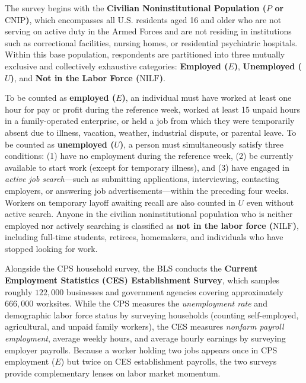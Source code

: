 \documentclass[11pt, a4paper]{article}
\begin{document}
The survey begins with the \textbf{Civilian Noninstitutional Population ($P$ or $\text{CNIP}$)}, which encompasses all U.S. residents aged 16 and older who are not serving on active duty in the Armed Forces and are not residing in institutions such as correctional facilities, nursing homes, or residential psychiatric hospitals. Within this base population, respondents are partitioned into three mutually exclusive and collectively exhaustive categories: \textbf{Employed ($E$)}, \textbf{Unemployed ($U$)}, and \textbf{Not in the Labor Force ($\text{NILF}$)}.

To be counted as \textbf{employed ($E$)}, an individual must have worked at least one hour for pay or profit during the reference week, worked at least 15 unpaid hours in a family-operated enterprise, or held a job from which they were temporarily absent due to illness, vacation, weather, industrial dispute, or parental leave. To be counted as \textbf{unemployed ($U$)}, a person must simultaneously satisfy three conditions: (1) have no employment during the reference week, (2) be currently available to start work (except for temporary illness), and (3) have engaged in \textit{active job search}—such as submitting applications, interviewing, contacting employers, or answering job advertisements—within the preceding four weeks. Workers on temporary layoff awaiting recall are also counted in $U$ even without active search. Anyone in the civilian noninstitutional population who is neither employed nor actively searching is classified as \textbf{not in the labor force ($\text{NILF}$)}, including full-time students, retirees, homemakers, and individuals who have stopped looking for work.

Alongside the CPS household survey, the BLS conducts the \textbf{Current Employment Statistics (CES) Establishment Survey}, which samples roughly $122{,}000$ businesses and government agencies covering approximately $666{,}000$ worksites. While the CPS measures the \textit{unemployment rate} and demographic labor force status by surveying households (counting self-employed, agricultural, and unpaid family workers), the CES measures \textit{nonfarm payroll employment}, average weekly hours, and average hourly earnings by surveying employer payrolls. Because a worker holding two jobs appears once in CPS employment ($E$) but twice on CES establishment payrolls, the two surveys provide complementary lenses on labor market momentum.
\end{document}
